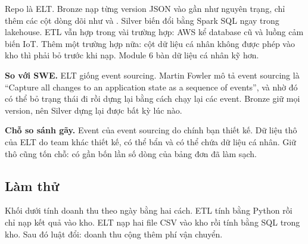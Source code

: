 Repo là ELT. Bronze nạp từng version JSON vào  gần như nguyên trạng, chỉ thêm các cột dòng dõi như  và . Silver biến đổi bằng Spark SQL ngay trong lakehouse. ETL vẫn hợp trong vài trường hợp: AWS kể database cũ và luồng cảm biến IoT. Thêm một trường hợp nữa: cột dữ liệu cá nhân không được phép vào kho thì phải bỏ trước khi nạp. Module 6 bàn dữ liệu cá nhân kỹ hơn.

\begin{ghichu}
\textbf{So với SWE.} ELT giống event sourcing. Martin Fowler mô tả event sourcing là ``Capture all changes to an application state as a sequence of events'', và nhờ đó có thể bỏ trạng thái đi rồi dựng lại bằng cách chạy lại các event. Bronze giữ mọi version, nên Silver dựng lại được bất kỳ lúc nào.

\textbf{Chỗ so sánh gãy.} Event của event sourcing do chính bạn thiết kế. Dữ liệu thô của ELT do team khác thiết kế, có thể bẩn và có thể chứa dữ liệu cá nhân. Giữ thô cũng tốn chỗ:  có gần bốn lần số dòng của bảng đơn đã làm sạch.
\end{ghichu}

\subsection{Làm thử}

Khối dưới tính doanh thu theo ngày bằng hai cách. ETL tính bằng Python rồi chỉ nạp kết quả vào kho. ELT nạp hai file CSV vào kho rồi tính bằng SQL trong kho. Sau đó luật đổi: doanh thu cộng thêm phí vận chuyển.

